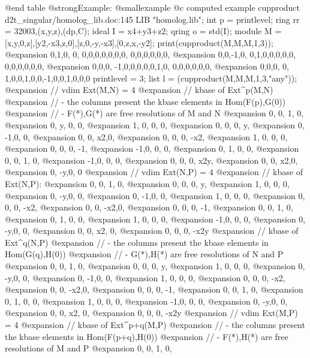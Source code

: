 @end table
@strong{Example:}
@smallexample
@c computed example cupproduct d2t_singular/homolog_lib.doc:145 
LIB "homolog.lib";
int p      = printlevel;
ring  rr   = 32003,(x,y,z),(dp,C);
ideal  I   = x4+y3+z2;
qring  o   = std(I);
module M   = [x,y,0,z],[y2,-x3,z,0],[z,0,-y,-x3],[0,z,x,-y2];
print(cupproduct(M,M,M,1,3));
@expansion{} 0,1,0, 0, 0,0,0,0,0,0,0, 0,0,0,0,0,0,
@expansion{} 0,0,-1,0, 0,1,0,0,0,0,0, 0,0,0,0,0,0,
@expansion{} 0,0,0, -1,0,0,0,0,0,1,0, 0,0,0,0,0,0,
@expansion{} 0,0,0, 0, 1,0,0,1,0,0,-1,0,0,1,0,0,0 
printlevel = 3;
list l     = (cupproduct(M,M,M,1,3,"any"));
@expansion{} // vdim Ext(M,N) = 4
@expansion{} // kbase of Ext^p(M,N)
@expansion{} //  - the columns present the kbase elements in Hom(F(p),G(0))
@expansion{} //  - F(*),G(*) are free resolutions of M and N
@expansion{} 0, 0, 1, 0,  
@expansion{} 0, y, 0, 0,  
@expansion{} 1, 0, 0, 0,  
@expansion{} 0, 0, 0, y,  
@expansion{} 0, -1,0, 0,  
@expansion{} 0, 0, x2,0,  
@expansion{} 0, 0, 0, -x2,
@expansion{} 1, 0, 0, 0,  
@expansion{} 0, 0, 0, -1, 
@expansion{} -1,0, 0, 0,  
@expansion{} 0, 1, 0, 0,  
@expansion{} 0, 0, 1, 0,  
@expansion{} -1,0, 0, 0,  
@expansion{} 0, 0, 0, x2y,
@expansion{} 0, 0, x2,0,  
@expansion{} 0, -y,0, 0   
@expansion{} // vdim Ext(N,P) = 4
@expansion{} // kbase of Ext(N,P):
@expansion{} 0, 0, 1,  0,  
@expansion{} 0, 0, 0,  y,  
@expansion{} 1, 0, 0,  0,  
@expansion{} 0, -y,0,  0,  
@expansion{} 0, -1,0,  0,  
@expansion{} 1, 0, 0,  0,  
@expansion{} 0, 0, 0,  -x2,
@expansion{} 0, 0, -x2,0,  
@expansion{} 0, 0, 0,  -1, 
@expansion{} 0, 0, 1,  0,  
@expansion{} 0, 1, 0,  0,  
@expansion{} 1, 0, 0,  0,  
@expansion{} -1,0, 0,  0,  
@expansion{} 0, -y,0,  0,  
@expansion{} 0, 0, x2, 0,  
@expansion{} 0, 0, 0,  -x2y
@expansion{} // kbase of Ext^q(N,P)
@expansion{} //  - the columns present the kbase elements in Hom(G(q),H(0))
@expansion{} //  - G(*),H(*) are free resolutions of N and P
@expansion{} 0, 0, 1,  0,  
@expansion{} 0, 0, 0,  y,  
@expansion{} 1, 0, 0,  0,  
@expansion{} 0, -y,0,  0,  
@expansion{} 0, -1,0,  0,  
@expansion{} 1, 0, 0,  0,  
@expansion{} 0, 0, 0,  -x2,
@expansion{} 0, 0, -x2,0,  
@expansion{} 0, 0, 0,  -1, 
@expansion{} 0, 0, 1,  0,  
@expansion{} 0, 1, 0,  0,  
@expansion{} 1, 0, 0,  0,  
@expansion{} -1,0, 0,  0,  
@expansion{} 0, -y,0,  0,  
@expansion{} 0, 0, x2, 0,  
@expansion{} 0, 0, 0,  -x2y
@expansion{} // vdim Ext(M,P) = 4
@expansion{} // kbase of Ext^p+q(M,P)
@expansion{} //  - the columns present the kbase elements in Hom(F(p+q),H(0))
@expansion{} //  - F(*),H(*) are free resolutions of M and P
@expansion{} 0, 0, 1,  0,  
